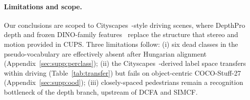 \documentclass{article}
\begin{document}
\paragraph{Limitations and scope.}
Our conclusions are scoped to Cityscapes~\cite{cordts2016cityscapes}-style driving scenes, where DepthPro~\cite{bochkovskii2024depthpro} depth and frozen DINO-family features~\cite{oquab2024dinov2,simeoni2025dinov3} replace the structure that stereo and motion provided in CUPS. Three limitations follow: (i) six dead classes in the pseudo-vocabulary are effectively absent after Hungarian alignment (Appendix~\ref{sec:supp:perclass}); (ii) the Cityscapes~\cite{cordts2016cityscapes}-derived label space transfers within driving (Table~\ref{tab:transfer}) but fails on object-centric COCO-Stuff-27~\cite{caesar2018coco} (Appendix~\ref{sec:supp:ood}); (iii) closely-spaced pedestrians remain a recognition bottleneck of the depth branch, upstream of DCFA and SIMCF.
\end{document}
